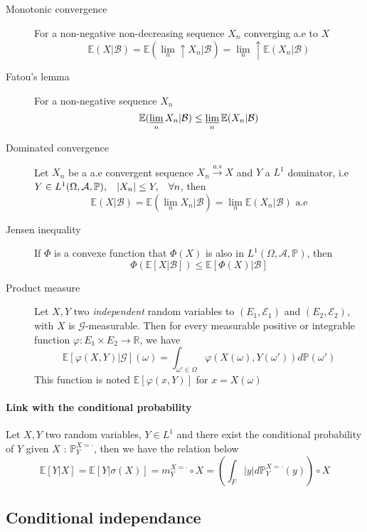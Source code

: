 \documentclass[a4paper,10pt]{article}
\begin{document}
\begin{enumerate}
\begin{description}
   \item [Monotonic convergence] For a non-negative non-decreasing sequence $X_n$ converging a.e to $X$
   \[
   \mathbb{E}(X|\mathcal{B}) = \mathbb{E}(\lim_n \uparrow X_n|\mathcal{B}) = \lim_n \uparrow \mathbb{E}(X_n|\mathcal{B})
   \]
   \item [Fatou's lemma]  For a non-negative sequence $X_n$
   \[
   \mathbb{E}(\varliminf_n  X_n|\mathcal{B}) \leq \varliminf_n  \mathbb{E}(X_n|\mathcal{B})
   \]
   \item [Dominated convergence] Let $X_n$ be a a.e convergent sequence $X_n \xrightarrow{a.s} X$ and $Y$ a $L^1$ dominator, i.e $Y\in L^1(\Omega, \mathcal{A}, \mathbb{P}), \hspace{3mm} |X_n| \leq Y,\hspace{3mm} \forall n$, then
   \[
   \mathbb{E}(X|\mathcal{B}) = \mathbb{E}(\lim_n  X_n|\mathcal{B}) = \lim_n \mathbb{E}(X_n|\mathcal{B}) \text{  a.e}
   \]
   \item [Jensen inequality] If $\Phi$ is a convexe function that $\Phi(X)$ is also in $L^1(\Omega, \mathcal{A}, \mathbb{P})$, then 
   \[
   \Phi( \mathbb{E}[X|\mathcal{B}] ) \leq \mathbb{E}[\Phi(X)|\mathcal{B}]
   \]
    \item [Product measure] Let $X,Y$ two \textit{independent} random variables to $(E_1,\mathcal{E}_1)$ and $(E_2,\mathcal{E}_2)$, with $X$ is $\mathcal{G}$-measurable. Then for every measurable positive or integrable function $\varphi : E_1\times E_2 \longrightarrow \mathbb{R}$, we have
    \[
    \mathbb{E}[\varphi(X,Y)|\mathcal{G}](\omega)  = \int_{\omega' \in \Omega} \varphi(X(\omega),Y(\omega ')) d\mathbb{P}(\omega ')
    \]
    This function is noted $\mathbb{E}[\varphi(x,Y)]$ for $x=X(\omega)$
  
  \end{description}

\end{enumerate}

\paragraph{Link with the conditional probability } Let $X,Y$ two random variables, $Y\in L^1$ and there exist the conditional probability of $Y$ given $X$ : $\mathbb{P}^{X=\cdot}_Y$, then we have the relation below
\[
\mathbb{E}[Y|X] = \mathbb{E}[Y|\sigma(X)] = m^{X=\cdot}_Y \circ X = (\int_F |y| d\mathbb{P}^{X=\cdot}_Y(y) )\circ X
\]

\subsection{Conditional independance}
\end{document}

